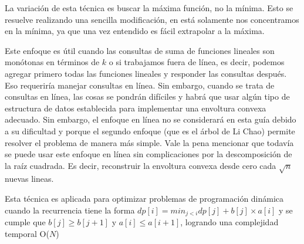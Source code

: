 La variación de esta técnica es buscar la máxima función, no la mínima. Esto se resuelve realizando una sencilla modificación, en está solamente nos concentramos en la mínima, ya que una vez entendido es fácil extrapolar a la máxima.

Este enfoque es útil cuando las consultas de suma de funciones lineales son monótonas en términos de $k$ o si trabajamos fuera de línea, es decir, podemos agregar primero todas las funciones lineales y responder las consultas después. Eso requeriría manejar consultas en línea. Sin embargo, cuando se trata de consultas en línea, las cosas se pondrán difíciles y habrá que usar algún tipo de estructura de datos establecida para implementar una envoltura convexa adecuado. Sin embargo, el enfoque en línea no se considerará en esta guía debido a su dificultad y porque el segundo enfoque (que es el árbol de Li Chao) permite resolver el problema de manera más simple. Vale la pena mencionar que todavía se puede usar este enfoque en línea sin complicaciones por la descomposición de la raíz cuadrada. Es decir, reconstruir la envoltura convexa desde cero cada $\sqrt n$ nuevas lineas.

Esta técnica es aplicada para optimizar problemas de programación dinámica cuando la recurrencia tiene la
forma $dp[i] = min_{j<i}{dp[j] + b[j]\times a[i]}$ y se cumple que $b[j] \ge b[j + 1]$ y $a[i] \le a[i + 1]$, logrando una complejidad temporal O($N$)